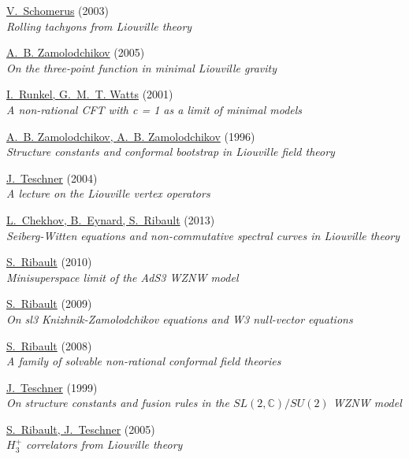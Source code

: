\begin{thebibliography}{10}
\href{http://arxiv.org/abs/hep-th/0306026}{V.~Schomerus} (2003)\\ {\em Rolling
  tachyons from Liouville theory\/}

\href{http://arxiv.org/abs/hep-th/0505063}{A.~B. Zamolodchikov} (2005)\\ {\em
  On the three-point function in minimal Liouville gravity\/}

\href{http://arxiv.org/abs/hep-th/0107118}{I.~Runkel, G.~M.~T. Watts} (2001)\\
  {\em A non-rational CFT with c = 1 as a limit of minimal models\/}

\href{http://arxiv.org/abs/hep-th/9506136}{A.~B. Zamolodchikov, A.~B.
  Zamolodchikov} (1996)\\ {\em Structure constants and conformal bootstrap in
  Liouville field theory\/}

\href{http://arxiv.org/abs/hep-th/0303150}{J.~Teschner} (2004)\\ {\em A lecture
  on the Liouville vertex operators\/}

\href{http://arxiv.org/abs/1209.3984}{L.~Chekhov, B.~Eynard, S.~Ribault}
  (2013)\\ {\em {Seiberg-Witten equations and non-commutative spectral curves
  in Liouville theory}\/}

\href{http://arxiv.org/abs/0912.4481}{S.~Ribault} (2010)\\ {\em {Minisuperspace
  limit of the AdS3 WZNW model}\/}

\href{http://arxiv.org/abs/0811.4587}{S.~Ribault} (2009)\\ {\em {On sl3
  Knizhnik-Zamolodchikov equations and W3 null-vector equations}\/}

\href{http://arxiv.org/abs/0803.2099}{S.~Ribault} (2008)\\ {\em {A family of
  solvable non-rational conformal field theories}\/}

\href{http://arxiv.org/abs/hep-th/9712256}{J.~Teschner} (1999)\\ {\em On
  structure constants and fusion rules in the $SL(2,\mathbb{C})/SU(2)$ {WZNW}
  model\/}

\href{http://arxiv.org/abs/hep-th/0502048}{S.~Ribault, J.~Teschner} (2005)\\
  {\em $H_3^+$ correlators from Liouville theory\/}


\end{thebibliography}
